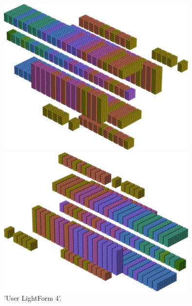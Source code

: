 \begin{minipage}[b]{0.48\linewidth}
\vspace{1cm}
\begin{figure}[H]
    \centering
    \begin{adjustbox}{width=5cm,margin=0cm 0cm}
      \includegraphics[width=10cm]{src/colorspace_patterns/pattern12-45.png}%
    \end{adjustbox}
    \begin{adjustbox}{width=5cm,margin=0cm 0cm}
      \includegraphics[width=10cm]{src/colorspace_patterns/pattern12-225.png}%
    \end{adjustbox}
\caption{'User LightForm 4'.}
\end{figure}
\end{minipage}
